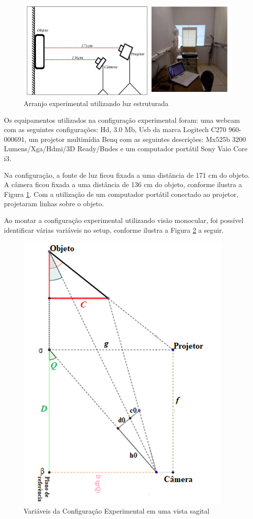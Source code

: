 \documentclass[a4paper, 12pt]{article}
\begin{document}
\begin{figure}[H]
	\centering
		\includegraphics[scale=0.5]{configuracao_sistema.png}
	\caption{Arranjo experimental utilizando luz estruturada}
	\label{arranjo experimetal}
\end{figure}


Os equipamentos utilizados na configuração experimental foram: uma webcam com as seguintes configurações: Hd, 3.0 Mb, Usb da marca Logitech C270 960-000691, um projetor multimídia Benq com as seguintes descrições: Mx525b 3200 Lumens/Xga/Hdmi/3D Ready/Bndes e um computador portátil Sony Vaio Core i3. 

Na configuração, a fonte de luz ficou fixada a uma distância de 171 cm do objeto. A câmera ficou fixada a uma distância de 136 cm do objeto, conforme ilustra a Figura \ref{arranjo experimetal}.  Com a utilização de um computador portátil conectado ao projetor, projetaram linhas sobre o objeto.

Ao montar a configuração experimental utilizando visão monocular, foi possível identificar várias variáveis no setup, conforme ilustra a Figura \ref{setup com as variaveis} a seguir.

\begin{figure}[H]
	\centering
		\includegraphics[scale=0.5]{vista_sagital.png}
	\caption{Variáveis da Configuração Experimental em uma vista sagital}
	\label{setup com as variaveis}
\end{figure}
\end{document}
